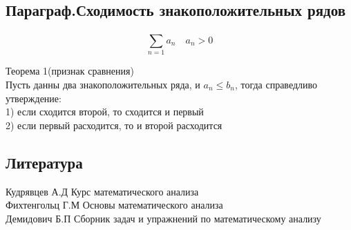 \documentclass[a4paper, 12pt]{article}
\begin{document}
\subsection{Параграф.Сходимость знакоположительных рядов}
\[
  \sum_{n=1}^{}a_n \quad a_n > 0  
\]
\begin{mdframed}[backgroundcolor=blue!20] 
       Теорема 1(признак сравнения)\\
       Пусть данны два знакоположительных ряда, и $ a_n \leq b_n $, тогда справедливо утверждение:\\
       1) если сходится второй, то сходится и первый\\
       2) если первый расходится, то и второй расходится\\ 
    \end{mdframed}





\newpage
\subsection*{Литература}
Кудрявцев А.Д Курс математического анализа\\
Фихтенгольц Г.М Основы математического анализа\\
Демидович Б.П Сборник задач и упражнений по математическому анализу\\
\end{document}
